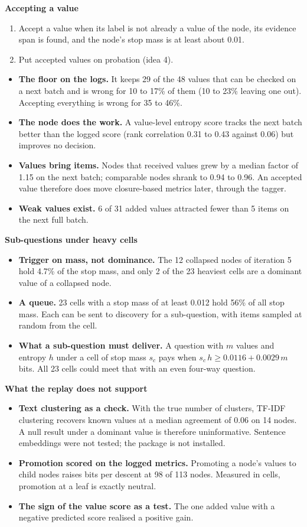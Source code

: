 \documentclass[10pt,a4paper]{article}
\newcommand{\lab}[1]{\par\vspace{0.35em}\textbf{#1}\par\nobreak}
\begin{document}
\lab{Accepting a value}
\begin{enumerate}
\item Accept a value when its label is not already a value of the node, its evidence span is found, and the node's stop mass is at least about 0.01.
\item Put accepted values on probation (idea 4).
\end{enumerate}
\begin{itemize}
\item \textbf{The floor on the logs.} It keeps 29 of the 48 values that can be checked on a next batch and is wrong for 10 to 17\% of them (10 to 23\% leaving one out). Accepting everything is wrong for 35 to 46\%.
\item \textbf{The node does the work.} A value-level entropy score tracks the next batch better than the logged score (rank correlation 0.31 to 0.43 against 0.06) but improves no decision.
\item \textbf{Values bring items.} Nodes that received values grew by a median factor of 1.15 on the next batch; comparable nodes shrank to 0.94 to 0.96. An accepted value therefore does move closure-based metrics later, through the tagger.
\item \textbf{Weak values exist.} 6 of 31 added values attracted fewer than 5 items on the next full batch.
\end{itemize}

\lab{Sub-questions under heavy cells}
\begin{itemize}
\item \textbf{Trigger on mass, not dominance.} The 12 collapsed nodes of iteration 5 hold 4.7\% of the stop mass, and only 2 of the 23 heaviest cells are a dominant value of a collapsed node.
\item \textbf{A queue.} 23 cells with a stop mass of at least 0.012 hold 56\% of all stop mass. Each can be sent to discovery for a sub-question, with items sampled at random from the cell.
\item \textbf{What a sub-question must deliver.} A question with $m$ values and entropy $h$ under a cell of stop mass $s_c$ pays when $s_c\,h \ge 0.0116 + 0.0029\,m$ bits. All 23 cells could meet that with an even four-way question.
\end{itemize}

\lab{What the replay does not support}
\begin{itemize}
\item \textbf{Text clustering as a check.} With the true number of clusters, TF-IDF clustering recovers known values at a median agreement of 0.06 on 14 nodes. A null result under a dominant value is therefore uninformative. Sentence embeddings were not tested; the package is not installed.
\item \textbf{Promotion scored on the logged metrics.} Promoting a node's values to child nodes raises bits per descent at 98 of 113 nodes. Measured in cells, promotion at a leaf is exactly neutral.
\item \textbf{The sign of the value score as a test.} The one added value with a negative predicted score realised a positive gain.
\end{itemize}
\end{document}
